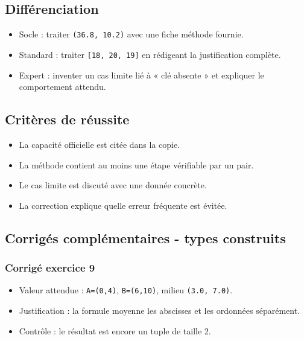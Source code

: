 \subsection{Différenciation}

\begin{itemize}
\tightlist
\item
  Socle : traiter \texttt{(36.8,\ 10.2)} avec une fiche méthode fournie.
\item
  Standard : traiter \texttt{{[}18,\ 20,\ 19{]}} en rédigeant la
  justification complète.
\item
  Expert : inventer un cas limite lié à « clé absente » et expliquer le
  comportement attendu.
\end{itemize}

\subsection{Critères de réussite}

\begin{itemize}
\tightlist
\item
  La capacité officielle est citée dans la copie.
\item
  La méthode contient au moins une étape vérifiable par un pair.
\item
  Le cas limite est discuté avec une donnée concrète.
\item
  La correction explique quelle erreur fréquente est évitée.
\end{itemize}

\subsection{Corrigés complémentaires - types construits}

\subsubsection{Corrigé exercice 9}

\begin{itemize}
\tightlist
\item
  Valeur attendue : \texttt{A=(0,4)}, \texttt{B=(6,10)}, milieu
  \texttt{(3.0,\ 7.0)}.
\item
  Justification : la formule moyenne les abscisses et les ordonnées
  séparément.
\item
  Contrôle : le résultat est encore un tuple de taille 2.
\end{itemize}

